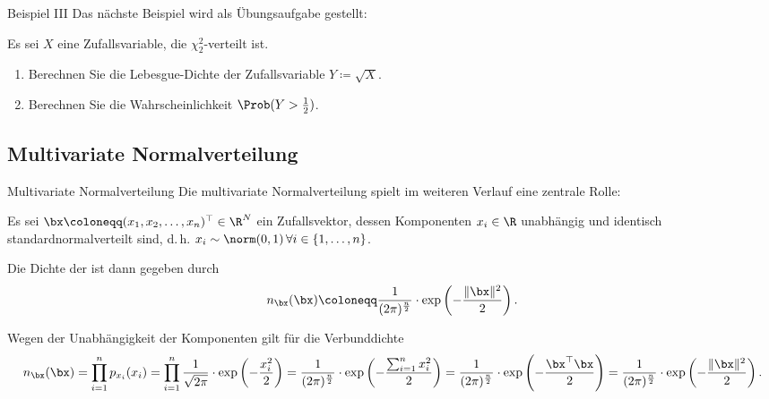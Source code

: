 \begin{frame}{Beispiel III}{}
	Das nächste Beispiel wird als Übungsaufgabe gestellt:
	\begin{mytask}
		Es sei $X$ eine Zufallsvariable, die $\chi_2^2$-verteilt ist.

		\begin{enumerate}
			\item Berechnen Sie die Lebesgue-Dichte der Zufallsvariable $Y \coloneqq \sqrt{X}$.
			\item Berechnen Sie die Wahrscheinlichkeit $\Prob(Y > \frac{1}{2})$.
		\end{enumerate}
	\end{mytask}
\end{frame}


\subsection{Multivariate Normalverteilung}

\begin{frame}{Multivariate Normalverteilung}{}
	Die multivariate Normalverteilung spielt im weiteren Verlauf eine zentrale Rolle:
	\begin{mytheo}
		Es sei $\bx \coloneqq (x_1, x_2, \ldots, x_n)^\top \in \R^N$ ein Zufallsvektor, dessen Komponenten
		$x_i \in \R$ unabhängig und identisch standardnormalverteilt sind,
		d.\,h. $x_i \sim \norm(0, 1)\,\forall i \in \{ 1, \ldots, n \}$.
		
		Die Dichte der  ist dann gegeben durch
		\begin{equation*}
			n_{\bx}(\bx) \coloneqq \frac{1}{(2 \pi)^{\frac{n}{2}}} \cdot \exp\left( -\frac{\Vert \bx \Vert^2}{2} \right).
		\end{equation*}
	\end{mytheo}

	\begin{myproof}
		Wegen der Unabhängigkeit der Komponenten gilt für die Verbunddichte
		\begin{equation*}
			n_{\bx}(\bx)
				= \prod_{i=1}^n p_{x_i}(x_i)
				= \prod_{i=1}^n \frac{1}{\sqrt{2 \pi}} \cdot \exp\left( -\frac{x_i^2}{2} \right)
				= \frac{1}{(2 \pi)^{\frac{n}{2}}} \cdot \exp\left( -\frac{\sum_{i=1}^n x_i^2}{2} \right)
				= \frac{1}{(2 \pi)^{\frac{n}{2}}} \cdot \exp\left( -\frac{\bx^\top \bx}{2} \right)
				= \frac{1}{(2 \pi)^{\frac{n}{2}}} \cdot \exp\left( -\frac{\Vert \bx \Vert^2}{2} \right).
		\end{equation*}
	\end{myproof}
\end{frame}


